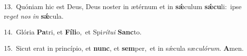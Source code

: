 {\numbfont\textcolor{\numbcolor}{13.}}~Quóniam hic est Deus, Deus noster in ætérnum et in \textbf{sǽ}\-culum \textbf{sǽ}\-\textbf{cu}li:~\star ipse re\textit{get} \textit{nos} \textit{in} \textbf{sǽ}\-cula.\par
{\numbfont\textcolor{\numbcolor}{14.}}~Glória \textbf{Pa}\-tri, et \textbf{Fí}\-\textbf{li}o,~\star et Spi\-\textit{rí}\-\textit{tu}\textit{i} \textbf{Sanc}\-to.\par
{\numbfont\textcolor{\numbcolor}{15.}}~Sicut erat in princípio, et \textbf{nunc}\-, et \textbf{sem}\-per,~\star et in sǽcula sæ\-\textit{cu}\-\textit{ló}\textit{rum}. \textbf{A}\-men.\par
